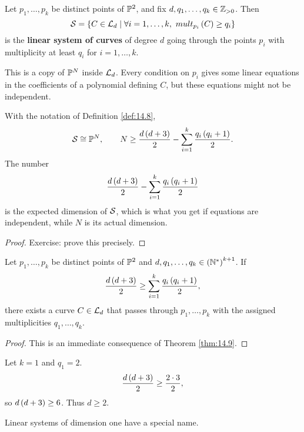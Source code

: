 
\begin{definition}
\label{def:14.8}
Let $ p_1, \dots, p_k $ be distinct points of $ \P^2 $, and fix $ d, q_1, \dots, q_k \in \Z_{> 0} $. Then
$$ \SS = \cb{C \in \LL_d \mid \forall i = 1, \dots, k, \ mult_{p_i}\rb{C} \ge q_i} $$
is the \textbf{linear system of curves} of degree $ d $ going through the points $ p_i $ with multiplicity at least $ q_i $ for $ i = 1, \dots, k $.
\end{definition}

This is a copy of $ \P^N $ inside $ \LL_d $. Every condition on $ p_i $ gives some linear equations in the coefficients of a polynomial defining $ C $, but these equations might not be independent.

\begin{theorem}
\label{thm:14.9}
With the notation of Definition \ref{def:14.8},
$$ \SS \cong \P^N, \qquad N \ge \dfrac{d\rb{d + 3}}{2} - \sum_{i = 1}^k \dfrac{q_i\rb{q_i + 1}}{2}. $$
The number
$$ \dfrac{d\rb{d + 3}}{2} - \sum_{i = 1}^k \dfrac{q_i\rb{q_i + 1}}{2} $$
is the expected dimension of $ \SS $, which is what you get if equations are independent, while $ N $ is its actual dimension.
\end{theorem}

\begin{proof}
Exercise: prove this precisely.
\end{proof}

\begin{corollary}
Let $ p_1, \dots, p_k $ be distinct points of $ \P^2 $ and $ d, q_1, \dots, q_k \in \rb{\N^*}^{k + 1} $. If
$$ \dfrac{d\rb{d + 3}}{2} \ge \sum_{i = 1}^k \dfrac{q_i\rb{q_i + 1}}{2}, $$
there exists a curve $ C \in \LL_d $ that passes through $ p_1, \dots, p_k $ with the assigned multiplicities $ q_1, \dots, q_k $.
\end{corollary}

\begin{proof}
This is an immediate consequence of Theorem \ref{thm:14.9}.
\end{proof}

\begin{example*}
Let $ k = 1 $ and $ q_1 = 2 $.
$$ \dfrac{d\rb{d + 3}}{2} \ge \dfrac{2 \cdot 3}{2}, $$
so $ d\rb{d + 3} \ge 6 $. Thus $ d \ge 2 $.
\end{example*}

Linear systems of dimension one have a special name.

